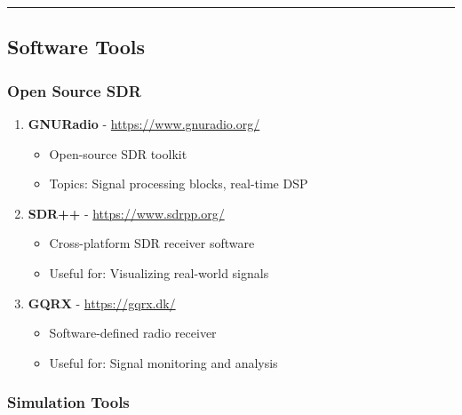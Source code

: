 \begin{center}\rule{0.5\linewidth}{0.5pt}\end{center}

\subsection{\texorpdfstring{ Software
Tools}{ Software Tools}}\label{software-tools}

\subsubsection{Open Source SDR}\label{open-source-sdr}

\begin{enumerate}
\def\labelenumi{\arabic{enumi}.}
\setcounter{enumi}{48}
\tightlist
\item
  \textbf{GNURadio} - \url{https://www.gnuradio.org/}

  \begin{itemize}
  \tightlist
  \item
    Open-source SDR toolkit
  \item
    Topics: Signal processing blocks, real-time DSP
  \end{itemize}
\item
  \textbf{SDR++} - \url{https://www.sdrpp.org/}

  \begin{itemize}
  \tightlist
  \item
    Cross-platform SDR receiver software
  \item
    Useful for: Visualizing real-world signals
  \end{itemize}
\item
  \textbf{GQRX} - \url{https://gqrx.dk/}

  \begin{itemize}
  \tightlist
  \item
    Software-defined radio receiver
  \item
    Useful for: Signal monitoring and analysis
  \end{itemize}
\end{enumerate}

\subsubsection{Simulation Tools}\label{simulation-tools}

